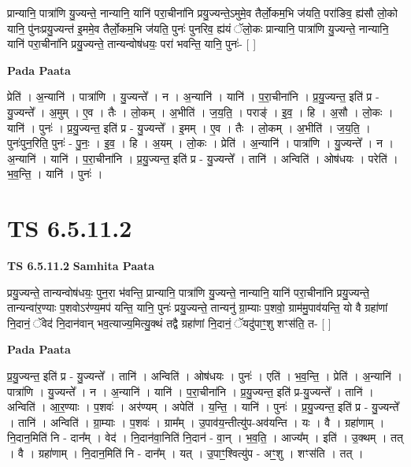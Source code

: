 \documentclass[17pt]{extarticle}
\begin{document}
प्रान्यानि॒ पात्रा॑णि यु॒ज्यन्ते॒ नान्यानि॒ यानि॑ परा॒चीना॑नि प्रयु॒ज्यन्ते॒ऽमुमे॒व तैर्लो॒कम॒भि ज॑यति॒ परा॑ङिव॒ ह्य॑सौ लो॒को यानि॒ पु॑नःप्रयु॒ज्यन्त॑ इ॒ममे॒व तैर्लो॒कम॒भि ज॑यति॒ पुनः॑ पुनरिव॒ ह्य॑यं ॅलो॒कः प्रान्यानि॒ पात्रा॑णि यु॒ज्यन्ते॒ नान्यानि॒ यानि॑ परा॒चीना॑नि प्रयु॒ज्यन्ते॒ तान्यन्वोष॑धयः॒ परा॑ भवन्ति॒ यानि॒ पुनः॑- [  ] \newline

\textbf{Pada Paata} \newline

प्रेति॑ । अ॒न्यानि॑ । पात्रा॑णि । यु॒ज्यन्ते᳚ । न । अ॒न्यानि॑ । यानि॑ । प॒रा॒चीना॑नि । प्र॒यु॒ज्यन्त॒ इति॑ प्र - यु॒ज्यन्ते᳚ । अ॒मुम् । ए॒व । तैः । लो॒कम् । अ॒भीति॑ । ज॒य॒ति॒ । पराङ्॑ । इ॒व॒ । हि । अ॒सौ । लो॒कः । यानि॑ । पुनः॑ । प्र॒यु॒ज्यन्त॒ इति॑ प्र - यु॒ज्यन्ते᳚ । इ॒मम् । ए॒व । तैः । लो॒कम् । अ॒भीति॑ । ज॒य॒ति॒ । पुनः॑पुन॒रिति॒ पुनः॑ - पु॒नः॒ । इ॒व॒ । हि । अ॒यम् । लो॒कः । प्रेति॑ । अ॒न्यानि॑ । पात्रा॑णि । यु॒ज्यन्ते᳚ । न । अ॒न्यानि॑ । यानि॑ । प॒रा॒चीना॑नि । प्र॒यु॒ज्यन्त॒ इति॑ प्र - यु॒ज्यन्ते᳚ । तानि॑ । अन्विति॑ । ओष॑धयः । परेति॑ । भ॒व॒न्ति॒ । यानि॑ । पुनः॑ ।  \newline





\section{ TS 6.5.11.2 }

\textbf{TS 6.5.11.2 } \newline
\textbf{Samhita Paata} \newline

प्रयु॒ज्यन्ते॒ तान्यन्वोष॑धयः॒ पुन॒रा भ॑वन्ति॒ प्रान्यानि॒ पात्रा॑णि यु॒ज्यन्ते॒ नान्यानि॒ यानि॑ परा॒चीना॑नि प्रयु॒ज्यन्ते॒ तान्यन्वा॑र॒ण्याः प॒शवोऽर॑ण्य॒मप॑ यन्ति॒ यानि॒ पुनः॑ प्रयु॒ज्यन्ते॒ तान्यनु॑ ग्रा॒म्याः प॒शवो॒ ग्राम॑मु॒पाव॑यन्ति॒ यो वै ग्रहा॑णां नि॒दानं॒ ॅवेद॑ नि॒दान॑वान् भव॒त्याज्य॒मित्यु॒क्थं तद्वै ग्रहा॑णां नि॒दानं॒ ॅयदु॑पाꣳ॒॒शु शꣳस॑ति॒ त- [  ] \newline

\textbf{Pada Paata} \newline

प्र॒यु॒ज्यन्त॒ इति॑ प्र - यु॒ज्यन्ते᳚ । तानि॑ । अन्विति॑ । ओष॑धयः । पुनः॑ । एति॑ । भ॒व॒न्ति॒ । प्रेति॑ । अ॒न्यानि॑ । पात्रा॑णि । यु॒ज्यन्ते᳚ । न । अ॒न्यानि॑ । यानि॑ । प॒रा॒चीना॑नि । प्र॒यु॒ज्यन्त॒ इति॑ प्र-यु॒ज्यन्ते᳚ । तानि॑ । अन्विति॑ । आ॒र॒ण्याः । प॒शवः॑ । अर॑ण्यम् । अपेति॑ । य॒न्ति॒ । यानि॑ । पुनः॑ । प्र॒यु॒ज्यन्त॒ इति॑ प्र - यु॒ज्यन्ते᳚ । तानि॑ । अन्विति॑ । ग्रा॒म्याः । प॒शवः॑ । ग्राम᳚म् । उ॒पाव॑य॒न्तीत्यु॑प-अव॑यन्ति । यः । वै । ग्रहा॑णाम् । नि॒दान॒मिति॑ नि - दान᳚म् । वेद॑ । नि॒दान॑वा॒निति॑ नि॒दान॑ - वा॒न् । भ॒व॒ति॒ । आज्य᳚म् । इति॑ । उ॒क्थम् । तत् । वै । ग्रहा॑णाम् । नि॒दान॒मिति॑ नि - दान᳚म् । यत् । उ॒पाꣳ॒॒श्वित्यु॑प - अꣳ॒॒शु । शꣳस॑ति । तत् ।  \newline
\end{document}
